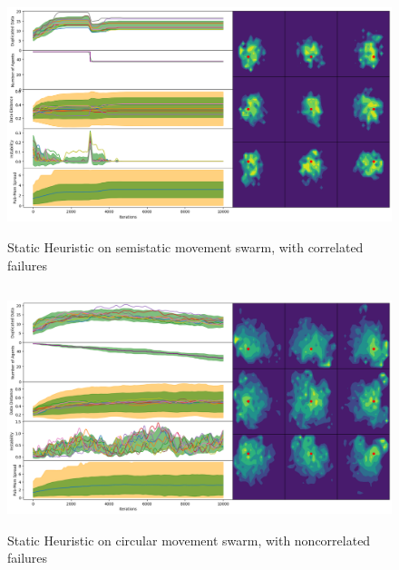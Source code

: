 \documentclass{UoYCSproject}
\begin{document}
\begin{figure}[htb]
\label{fig:static_movement_con}
\begin{center}
\centering
\includegraphics[height=7cm]{"./Static_Heuristic/Static_Movement_concurrent.png"}
\caption{Static Heuristic on semi\-static movement swarm, with correlated failures}
\end{center}
\end{figure}

\begin{figure}[htb]
\label{fig:circle_movement_non}
\begin{center}
\centering
\includegraphics[height=7cm]{"./Static_Heuristic/Circle_movement_non.png"}
\caption{Static Heuristic on circular movement swarm, with non\-correlated failures}
\end{center}
\end{figure}
\end{document}
